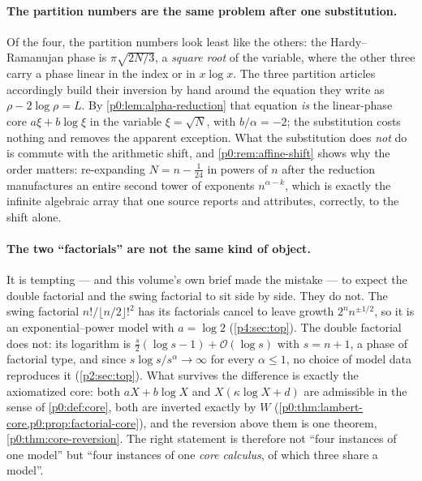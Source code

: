 \documentclass[11pt,a4paper,oneside]{book}
\theoremstyle{plain}
\theoremstyle{definition}
\theoremstyle{remark}
\newcommand{\bigO}{\mathcal{O}}
\newcommand{\Wlam}{W}
\begin{document}
\paragraph{The partition numbers are the same problem after one substitution.}
Of the four, the partition numbers look least like the others: the
Hardy--Ramanujan phase is $\pi\sqrt{2N/3}$, a \emph{square root} of the
variable, where the other three carry a phase linear in the index or in
$x\log x$.  The three partition articles accordingly build their inversion by
hand around the equation they write as $\rho-2\log\rho=L$.  By
\cref{p0:lem:alpha-reduction} that equation \emph{is} the linear-phase core
$a\xi+b\log\xi$ in the variable $\xi=\sqrt{N}$, with $b/\alpha=-2$; the
substitution costs nothing and removes the apparent exception.  What the
substitution does \emph{not} do is commute with the arithmetic shift, and
\cref{p0:rem:affine-shift} shows why the order matters: re-expanding
$N=n-\tfrac1{24}$ in powers of $n$ after the reduction manufactures an entire
second tower of exponents $n^{\alpha-k}$, which is exactly the infinite
algebraic array that one source reports and attributes, correctly, to the
shift alone.

\paragraph{The two ``factorials'' are not the same kind of object.}
It is tempting --- and this volume's own brief made the mistake --- to expect
the double factorial and the swing factorial to sit side by side.  They do
not.  The swing factorial $n!/\lfloor n/2\rfloor!^{2}$ has its factorials
cancel to leave growth $2^{n}n^{\pm1/2}$, so it is an exponential--power model
with $a=\log2$ (\cref{p4:sec:top}).  The double factorial does not: its
logarithm is $\tfrac{s}{2}(\log s-1)+\bigO(\log s)$ with $s=n+1$, a phase of
factorial type, and since $s\log s/s^{\alpha}\to\infty$ for every
$\alpha\le1$, no choice of model data reproduces it
(\cref{p2:sec:top}).  What survives the difference is exactly the axiomatized
core: both $aX+b\log X$ and $X(\kappa\log X+d)$ are admissible in the sense of
\cref{p0:def:core}, both are inverted exactly by $\Wlam$
(\cref{p0:thm:lambert-core,p0:prop:factorial-core}), and the reversion above
them is one theorem, \cref{p0:thm:core-reversion}.  The right statement is
therefore not ``four instances of one model'' but ``four instances of one
\emph{core calculus}, of which three share a model''.
\end{document}
